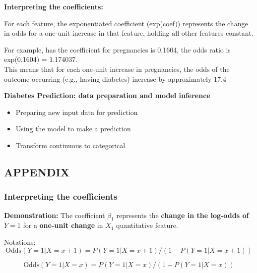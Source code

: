 \documentclass{article}
\providecommand{\tightlist}{%
  \setlength{\itemsep}{0pt}\setlength{\parskip}{0pt}}
\begin{document}
\textbf{Interpreting the coefficients:}

For each feature, the exponentiated coefficient (exp(coef)) represents
the change in odds for a one-unit increase in that feature, holding all
other features constant.

For example, has the coefficient for
\textquotesingle pregnancies\textquotesingle{} is 0.1604, the odds ratio
is exp(0.1604) = 1.174037.\\
This means that for each one-unit increase in pregnancies, the odds of
the outcome occurring (e.g., having diabetes) increase by approximately
17.4%

\textbf{Diabetes Prediction: data preparation and model inference}

\begin{itemize}
\tightlist
\item
  Preparing new input data for prediction
\end{itemize}

\begin{itemize}
\tightlist
\item
  Using the model to make a prediction
\end{itemize}

\begin{itemize}
\tightlist
\item
  Transform continuous to categorical
\end{itemize}

\subsection{APPENDIX}\label{appendix}

\subsubsection{Interpreting the
coefficients}\label{interpreting-the-coefficients}

\textbf{Demonstration:} The coefficient \(\beta_1\)\hspace{0pt}
represents the \textbf{change in the log-odds of} \(Y=1\) for a
\textbf{one-unit change} in \(X_1\)\hspace{0pt} quantitative feature.

Notations:\\
\[\text{Odds}(Y=1|X=x+1)=P(Y=1|X=x+1) / (1-P(Y=1|X=x+1))\]

\[\text{Odds}(Y=1|X=x)=P(Y=1|X=x) / (1-P(Y=1|X=x))\]
\end{document}
